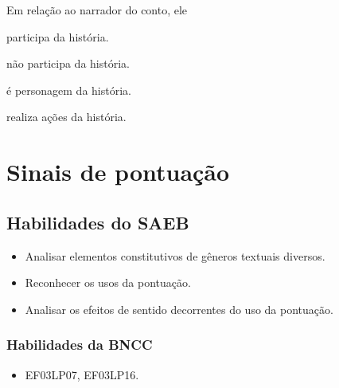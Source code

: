 Em relação ao narrador do conto, ele

\begin{escolha}[itemsep=-5pt]
\item participa da história.

\item não participa da história.

\item é personagem da história.

\item realiza ações da história.
\end{escolha}

\chapter{Sinais de pontuação}


\section*{Habilidades do SAEB}

\begin{itemize}
  \item Analisar elementos constitutivos de gêneros textuais diversos.
  \item Reconhecer os usos da pontuação.
  \item Analisar os efeitos de sentido decorrentes do uso da pontuação.
\end{itemize}

\subsection{Habilidades da BNCC}

\begin{itemize}
  \item EF03LP07, EF03LP16.
\end{itemize}



